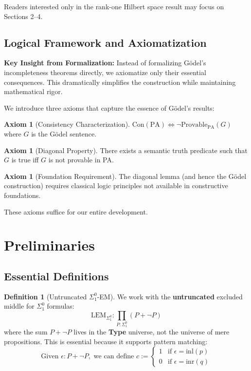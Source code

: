 \documentclass[11pt]{article}
\theoremstyle{definition}
\newtheorem{definition}[theorem]{Definition}
\newtheorem{axiom}[theorem]{Axiom}
\newcommand{\SigOne}{\Sigma^{0}_{\!1}}
\newcommand{\PA}{\mathrm{PA}}
\newcommand{\Con}{\mathrm{Con}}
\begin{document}
Readers interested only in the rank-one Hilbert space result may focus on Sections 2--4.

\subsection{Logical Framework and Axiomatization}

\begin{mdframed}[roundcorner=4pt]
\textbf{Key Insight from Formalization:} Instead of formalizing Gödel's incompleteness theorems directly, we axiomatize only their essential consequences. This dramatically simplifies the construction while maintaining mathematical rigor.
\end{mdframed}

We introduce three axioms that capture the essence of Gödel's results:

\begin{axiom}[Consistency Characterization]\label{ax:consistency}
$\Con(\PA) \iff \neg\text{Provable}_{\PA}(G)$
where $G$ is the Gödel sentence.
\end{axiom}

\begin{axiom}[Diagonal Property]\label{ax:diagonal}
There exists a semantic truth predicate such that $G$ is true iff $G$ is not provable in PA.
\end{axiom}

\begin{axiom}[Foundation Requirement]\label{ax:foundation}
The diagonal lemma (and hence the Gödel construction) requires classical logic principles not available in constructive foundations.
\end{axiom}

These axioms suffice for our entire development.

\section{Preliminaries}

\subsection{Essential Definitions}

\begin{definition}[Untruncated $\SigOne$-EM]\label{def:untruncated}
We work with the \textbf{untruncated} excluded middle for $\SigOne$ formulas:
\[
\text{LEM}_{\SigOne} : \prod_{P : \SigOne} (P + \neg P)
\]
where the sum $P + \neg P$ lives in the \textbf{Type} universe, not the universe of mere propositions. This is essential because it supports pattern matching:
\[
\text{Given } \epsilon : P + \neg P, \text{ we can define } c := \begin{cases}
1 & \text{if } \epsilon = \mathrm{inl}(p) \\
0 & \text{if } \epsilon = \mathrm{inr}(q)
\end{cases}
\]
\end{definition}
\end{document}
